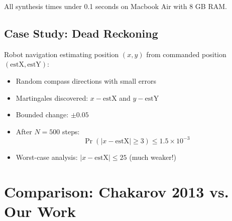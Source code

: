 \documentclass{article}
\begin{document}
All synthesis times under 0.1 seconds on Macbook Air with 8 GB RAM.

\subsection{Case Study: Dead Reckoning}

Robot navigation estimating position $(x, y)$ from commanded position $(\text{estX}, \text{estY})$:
\begin{itemize}
    \item Random compass directions with small errors
    \item Martingales discovered: $x - \text{estX}$ and $y - \text{estY}$
    \item Bounded change: $\pm 0.05$
    \item After $N = 500$ steps:
    \begin{equation}
    \Pr(|x - \text{estX}| \geq 3) \leq 1.5 \times 10^{-3}
    \end{equation}
    \item Worst-case analysis: $|x - \text{estX}| \leq 25$ (much weaker!)
\end{itemize}

\section{Comparison: Chakarov 2013 vs. Our Work}
\end{document}
